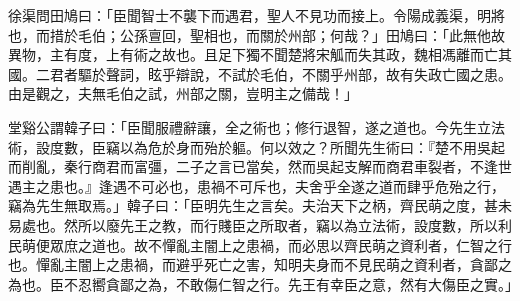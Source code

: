 
\begin{pinyinscope}
徐渠問田鳩曰：「臣聞智士不襲下而遇君，聖人不見功而接上。令陽成義渠，明將也，而措於毛伯；公孫亶回，聖相也，而關於州部；何哉？」田鳩曰：「此無他故異物，主有度，上有術之故也。且足下獨不聞楚將宋觚而失其政，魏相馮離而亡其國。二君者驅於聲詞，眩乎辯說，不試於毛伯，不關乎州部，故有失政亡國之患。由是觀之，夫無毛伯之試，州部之關，豈明主之備哉！」

堂谿公謂韓子曰：「臣聞服禮辭讓，全之術也；修行退智，遂之道也。今先生立法術，設度數，臣竊以為危於身而殆於軀。何以效之？所聞先生術曰：『楚不用吳起而削亂，秦行商君而富彊，二子之言已當矣，然而吳起支解而商君車裂者，不逢世遇主之患也。』逢遇不可必也，患禍不可斥也，夫舍乎全遂之道而肆乎危殆之行，竊為先生無取焉。」韓子曰：「臣明先生之言矣。夫治天下之柄，齊民萌之度，甚未易處也。然所以廢先王之教，而行賤臣之所取者，竊以為立法術，設度數，所以利民萌便眾庶之道也。故不憚亂主闇上之患禍，而必思以齊民萌之資利者，仁智之行也。憚亂主闇上之患禍，而避乎死亡之害，知明夫身而不見民萌之資利者，貪鄙之為也。臣不忍嚮貪鄙之為，不敢傷仁智之行。先王有幸臣之意，然有大傷臣之實。」


\end{pinyinscope}
